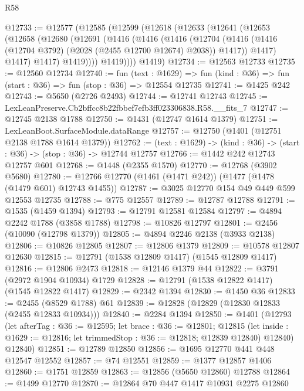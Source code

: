 \begin{lexlean}{R58}
\begin{coremodule}
{{@12733 := @12577
    (@12585
      (@12599
        (@12618
          (@12633
            (@12641
              (@12653
                (@12658
                  (@12680
                    (@12691
                      (@1416
                        (@1416
                          (@1416
                            (@12704
                              (@1416
                                (@1416 (@12704 @3792) (@2028 (@2455 @12700 @12674) @2038))
                                @1417))
                            @1417)
                          @1417)
                        @1417)
                      @1419))))
              @1419))))
      @1419)
@12734 := @12563 @12733
@12735 := @12560 @12734
@12740 := fun (text : @1629) =>
  fun (kind : @36) => fun (start : @36) => fun (stop : @36) => @12554 @12735
@12741 := @1425 @242
@12743 := @5650 (@2726 @2493)
@12744 := @12741 @12743
@12745 := LexLeanPreserve.Cb2bffcc8b22fbbef7efb3ff023306838.R58.__fits_7
@12747 := @12745 @2138 @1788
@12750 := @1431 (@12747 @1614 @1379)
@12751 := LexLeanBoot.SurfaceModule.dataRange
@12757 := @12750 (@1401 (@12751 @2138 @1788 @1614 @1379))
@12762 := (text : @1629) -> (kind : @36) -> (start : @36) -> (stop : @36) -> @12744 @12757
@12766 := @1442 @242 @12743 @12757 @601
@12768 := @1448 (@2355 @1570)
@12770 := @12768 (@3902 @5680)
@12780 := @12766 @12770 (@1461 (@1471 @242)) (@1477 (@1478 (@1479 @601) @12743 @1455))
@12787 := @3025 @12770 @154 @49 @449 @599 @12553 @12735
@12788 := @775 @12557
@12789 := @12787 @12788
@12791 := @1535 (@1459 @1394)
@12793 := @12791 @12581 @12584
@12797 := @4894 @2242 @1788 (@3858 @1788)
@12798 := @10826 @12797
@12801 := @2456 (@10090 (@12798 @1379))
@12805 := @4894 @2246 @2138 (@3933 @2138)
@12806 := @10826 @12805
@12807 := @12806 @1379
@12809 := @10578 @12807 @12630
@12815 := @12791 (@1538 @12809 @1417) (@1545 @12809 @1417)
@12816 := @12806 @2473
@12818 := @12146 @1379 @44
@12822 := @3791 (@2972 @1904 @10934) @1729
@12828 := @12791 (@1538 @12822 @1417) (@1545 @12822 @1417)
@12829 := @2342 @1394
@12830 := @1450 @36
@12833 := @2455 (@8529 @1788) @61
@12839 := @12828 (@12829 (@12830 @12833 (@2455 @12833 @10934)))
@12840 := @2284 @1394
@12850 := @1401
    (@12793
      (let afterTag : @36 := @12595;
      let brace : @36 := @12801;
      @12815 (let inside : @1629 := @12816; let trimmedStop : @36 := @12818; @12839 @12840) @12840)
      @12840)
@12851 := @12789 @12850
@12856 := @1695 @12770 @441 @448 @12547 @12552
@12857 := @74 @12551
@12859 := @1377 @12857 @1406
@12860 := @1751 @12859
@12863 := @12856 (@5650 @12860) @12788
@12864 := @1499 @12770
@12870 := @12864 @70 @447 @1417 @10931 @2275 @12860
}}
\end{coremodule}
\end{lexlean}
